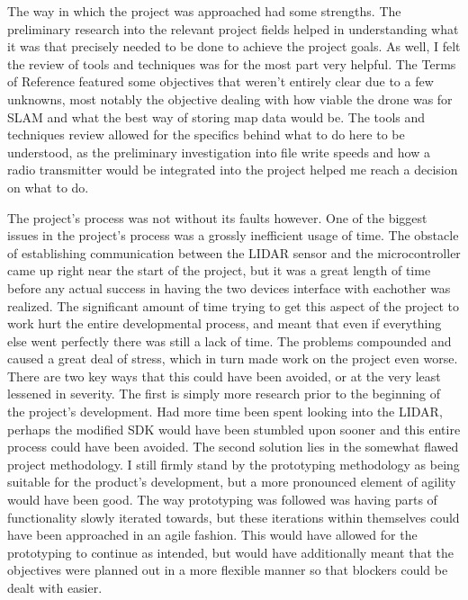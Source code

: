 	
	
	The way in which the project was approached had some strengths. The preliminary research into the relevant project fields helped in understanding what it was that precisely needed to be done to achieve the project goals. As well, I felt the review of tools and techniques was for the most part very helpful. The Terms of Reference featured some objectives that weren't entirely clear due to a few unknowns, most notably the objective dealing with how viable the drone was for SLAM and what the best way of storing map data would be. The tools and techniques review allowed for the specifics behind what to do here to be understood, as the preliminary investigation into file write speeds and how a radio transmitter would be integrated into the project helped me reach a decision on what to do.
	
	The project's process was not without its faults however. One of the biggest issues in the project's process was a grossly inefficient usage of time. The obstacle of establishing communication between the LIDAR sensor and the microcontroller came up right near the start of the project, but it was a great length of time before any actual success in having the two devices interface with eachother was realized. The significant amount of time trying to get this aspect of the project to work hurt the entire developmental process, and meant that even if everything else went perfectly there was still a lack of time. The problems compounded and caused a great deal of stress, which in turn made work on the project even worse. There are two key ways that this could have been avoided, or at the very least lessened in severity. The first is simply more research prior to the beginning of the project's development. Had more time been spent looking into the LIDAR, perhaps the modified SDK would have been stumbled upon sooner and this entire process could have been avoided. The second solution lies in the somewhat flawed project methodology. I still firmly stand by the prototyping methodology as being suitable for the product's development, but a more pronounced element of agility would have been good. The way prototyping was followed was having parts of functionality slowly iterated towards, but these iterations within themselves could have been approached in an agile fashion. This would have allowed for the prototyping to continue as intended, but would have additionally meant that the objectives were planned out in a more flexible manner so that blockers could be dealt with easier.
	
